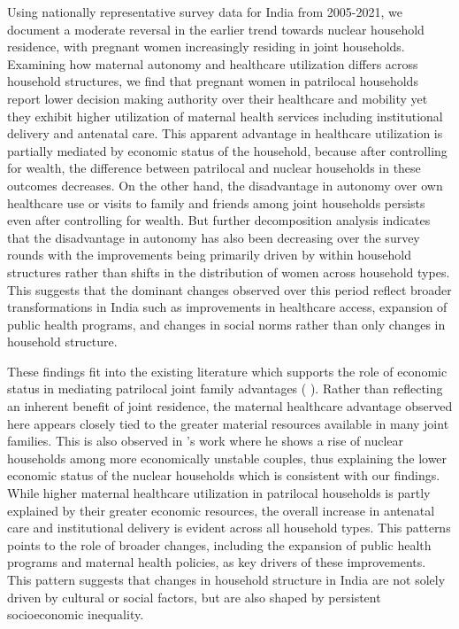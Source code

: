 \documentclass[12pt]{article}
\begin{document}
Using nationally representative survey data for India from 2005-2021, we document a moderate reversal in the earlier trend towards nuclear household residence, with pregnant women increasingly residing in joint households.  Examining how maternal autonomy and healthcare utilization differs across household structures, we find that pregnant women in patrilocal households report lower decision making authority over their healthcare and mobility yet they exhibit higher utilization of maternal health services including institutional delivery and antenatal care. This apparent advantage in healthcare utilization is partially mediated by economic status of the household, because after controlling for wealth, the difference between patrilocal and nuclear households in these outcomes decreases. On the other hand, the disadvantage in autonomy over own healthcare use or visits to family and friends among joint households persists even after controlling for wealth.  But further decomposition analysis indicates that the disadvantage in autonomy has also been decreasing over the survey rounds with the improvements being primarily driven by within household structures rather than shifts in the distribution of women across household types. This suggests that the dominant changes observed over this period reflect broader transformations in India such as improvements in healthcare access, expansion of public health programs, and changes in social norms rather than only changes in household structure. 


These findings fit into the existing literature which supports the role of economic status in mediating patrilocal joint family advantages (\cite{allendorf2013going} \cite{breton2021modernisation}). Rather than reflecting an inherent benefit of joint residence, the maternal healthcare advantage observed here appears closely tied to the greater material resources available in many joint families. This is also observed in \cite{breton2021modernisation}'s work where he shows a rise of nuclear households among more economically unstable couples, thus explaining the lower economic status of the nuclear households which is consistent with our findings. While higher maternal healthcare utilization in patrilocal households is partly explained by their greater economic resources, the overall increase in antenatal care and institutional delivery is evident across all household types. This patterns points to the role of broader changes, including the expansion of public health programs and maternal health policies, as key drivers of these improvements. This pattern suggests that changes in household structure in India are not solely driven by cultural or social factors, but are also shaped by persistent socioeconomic inequality. 
\end{document}
